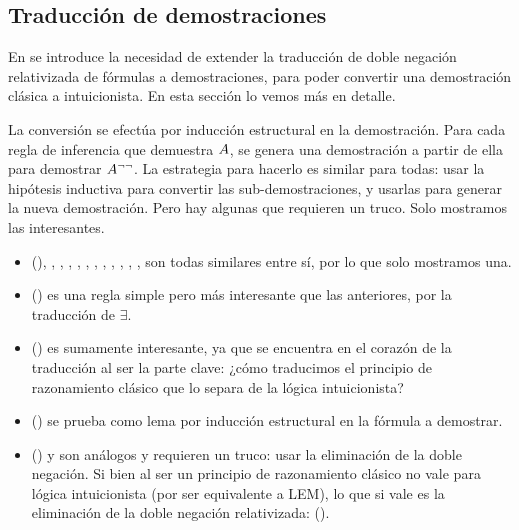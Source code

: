 \subsection{Traducción de demostraciones}
\label{fri:sec:proof-trans}

En  se introduce la necesidad de extender la traducción de doble negación relativizada de fórmulas a demostraciones, para poder convertir una demostración clásica a intuicionista. En esta sección lo vemos más en detalle.

La conversión se efectúa por inducción estructural en la demostración. Para cada regla de inferencia que demuestra $A$, se genera una demostración a partir de ella para demostrar $A^{\neg\neg}$. La estrategia para hacerlo es similar para todas: usar la hipótesis inductiva para convertir las sub-demostraciones, y usarlas para generar la nueva demostración. Pero hay algunas que requieren un truco. Solo mostramos las interesantes.

\begin{itemize}
    \item {} (), , , , , 
    , , , , , , ,  son todas similares entre sí, por lo que solo mostramos una.
    \item {} () es una regla simple pero más interesante que las anteriores, por la traducción de $\exists$.
    \item {} () es sumamente interesante, ya que se encuentra en el corazón de la traducción al ser la parte clave: ¿cómo traducimos el principio de razonamiento clásico que lo separa de la lógica intuicionista?
    \item {} ()  se prueba como lema por inducción estructural en la fórmula a demostrar.
    \item {} () y  son análogos y requieren un truco: usar la eliminación de la doble negación. Si bien al ser un principio de razonamiento clásico no vale para lógica intuicionista (por ser equivalente a LEM), lo que si vale es la eliminación de la doble negación relativizada:  ().
\end{itemize}

